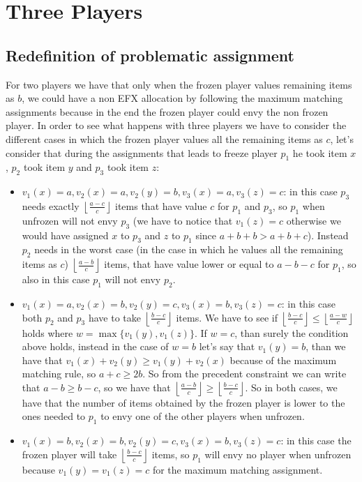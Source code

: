\documentclass{article}
\newcommand{\floor}[3][2]{\left \lfloor\frac{#2}{#3}\right \rfloor}
\begin{document}
\section{Three Players}
\subsection{Redefinition of problematic assignment}
For two players we have that only when the frozen player values remaining items as $b$, we could have a non EFX allocation by following the maximum matching assignments because in the end the frozen player could envy the non frozen player. In order to see what happens with three players we have to consider the different cases in which the frozen player values all the remaining items as $c$, let's consider that during the assignments that leads to freeze player $p_1$ he took item $x$, $p_2$ took item $y$ and $p_3$ took item $z$: 
\begin{itemize}
    \item $v_1(x) = a, v_2(x) = a, v_2(y) = b, v_3(x) = a, v_3(z) = c$: in this case $p_3$ needs exactly $\floor{a-c}{c}$ items that have value $c$ for $p_1$ and $p_3$, so $p_1$ when unfrozen will not envy $p_3$ (we have to notice that $v_1(z) = c$ otherwise we would have assigned $x$ to $p_3$ and $z$ to $p_1$ since $a + b + b > a + b + c$). Instead $p_2$ needs in the worst case (in the case in which he values all the remaining items as $c$) $\floor{a-b}{c}$ items, that have value lower or equal to $a-b-c$ for $p_1$, so also in this case $p_1$ will not envy $p_2$.
    
    \item $v_1(x) = a, v_2(x) = b, v_2(y) = c, v_3(x) = b, v_3(z) = c$: in this case both $p_2$ and $p_3$ have to take $\floor{b-c}{c}$ items. We have to see if $\floor{b-c}{c}\le \floor{a-w}{c}$ holds where $w=\max\{v_1(y), v_1(z)\}$. If $w=c$, than surely the condition above holds, instead in the case of $w=b$ let's say that $v_1(y) = b$, than we have that $v_1(x) + v_2(y) \ge v_1(y) + v_2(x)$ because of the maximum matching rule, so $a + c \ge 2b$. So from the precedent constraint we can write that $a -b \ge b-c$, so we have that $\floor{a-b}{c} \ge \floor{b-c}{c}$. So in both cases, we have that the number of items obtained by the frozen player is lower to the ones needed to $p_1$ to envy one of the other players when unfrozen.
    
    \item $v_1(x) = b, v_2(x) = b, v_2(y) = c, v_3(x) = b, v_3(z) = c$: in this case the frozen player will take $\floor{b-c}{c}$ items, so $p_1$ will envy no player when unfrozen because $v_1(y) = v_1(z) = c$ for the maximum matching assignment.
\end{itemize}
\end{document}
